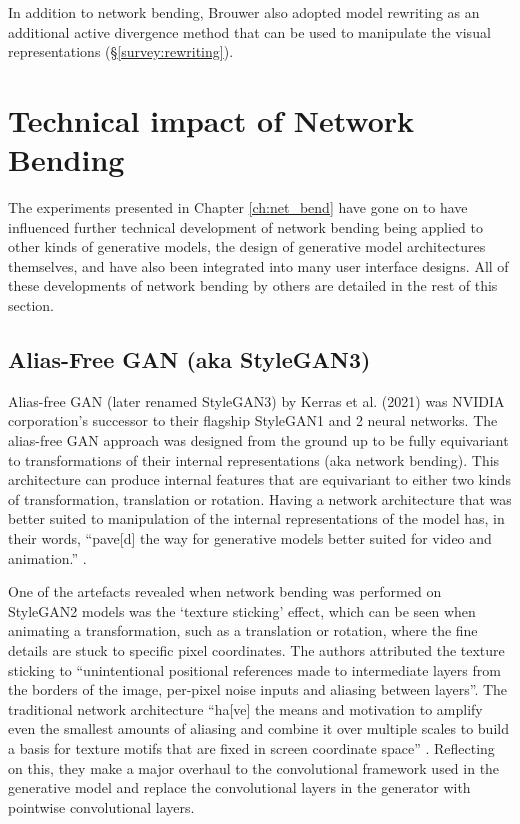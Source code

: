 In addition to network bending, Brouwer also adopted model rewriting \citep{bau2020rewriting} as an additional active divergence method that can be used to manipulate the visual representations (\S \ref{survey:rewriting}).

\section{Technical impact of Network Bending}
\label{c7:sec:net-bend-impact}

The experiments presented in Chapter \ref{ch:net_bend} have gone on to have influenced further technical development of network bending being applied to other kinds of generative models, the design of generative model architectures themselves, and have also been integrated into many user interface designs. All of these developments of network bending by others are detailed in the rest of this section.

 \subsection{Alias-Free GAN (aka StyleGAN3)}

 Alias-free GAN (later renamed StyleGAN3) by Kerras et al. (2021) was NVIDIA corporation's successor to their flagship StyleGAN1 and 2 neural networks. 
 The alias-free GAN approach was designed from the ground up to be fully equivariant to transformations of their internal representations (aka network bending). 
 This architecture can produce internal features that are equivariant to either two kinds of transformation, translation or rotation. 
 Having a network architecture that was better suited to manipulation of the internal representations of the model has, in their words, “pave[d] the way for generative models better suited for video and animation.” \citep{karras2021alias}.

 One of the artefacts revealed when network bending was performed on StyleGAN2 models was the ‘texture sticking’ effect, which can be seen when animating a transformation, such as a translation or rotation, where the fine details are stuck to specific pixel coordinates. 
 The authors attributed the texture sticking to “unintentional positional references made to intermediate layers from the borders of the image, per-pixel noise inputs and aliasing between layers”. 
 The traditional network architecture “ha[ve] the means and motivation to amplify even the smallest amounts of aliasing and combine it over multiple scales to build a basis for texture motifs that are fixed in screen coordinate space” \citep{karras2021alias}.
 Reflecting on this, they make a major overhaul to the convolutional framework used in the generative model and replace the convolutional layers in the generator with pointwise convolutional layers.

